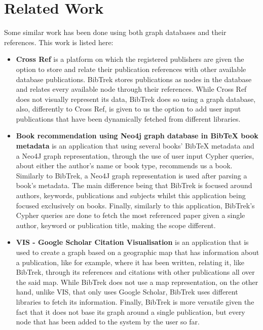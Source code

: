 \documentclass[twocolumn]{article}
\begin{document}
\section{Related Work}
Some similar work has been done using both graph databases and their references. This work is listed here:
\begin{itemize}
\item \textbf{Cross Ref} is a platform on which the registered publishers are given the option to store and relate their publication references with other available database publications. BibTrek stores publications as nodes in the database and relates every available node through their references. While Cross Ref does not visually represent its data, BibTrek does so using a graph database, also, differently to Cross Ref, is given to us the option to add user input publications that have been dynamically fetched from different libraries. 
\item \textbf{Book recommendation using Neo4j graph database in BibTeX book metadata} is an application that using several books' BibTeX metadata and a Neo4J graph representation, through the use of user input Cypher queries, about either the author's name or book type, recommends us a book. Similarly to BibTrek, a Neo4J graph representation is used after parsing a book's metadata. The main difference being that BibTrek is focused around authors, keywords, publications and subjects whilst this application being focused exclusively on books. Finally, similarly to this application, BibTrek's Cypher queries are done to fetch the most referenced paper given a single author, keyword or publication title, making the scope different.
\item \textbf{VIS - Google Scholar Citation Visualisation} is an application that is used to create a graph based on a geographic map that has information about a publication, like for example, where it has been written, relating it, like BibTrek, through its references and citations with other publications all over the said map. While BibTrek does not use a map representation, on the other hand, unlike VIS, that only uses Google Scholar, BibTrek uses different libraries to fetch its information. Finally, BibTrek is more versatile given the fact that it does not base its graph around a single publication, but every node that has been added to the system by the user so far. %
\end{itemize}
\end{document}
